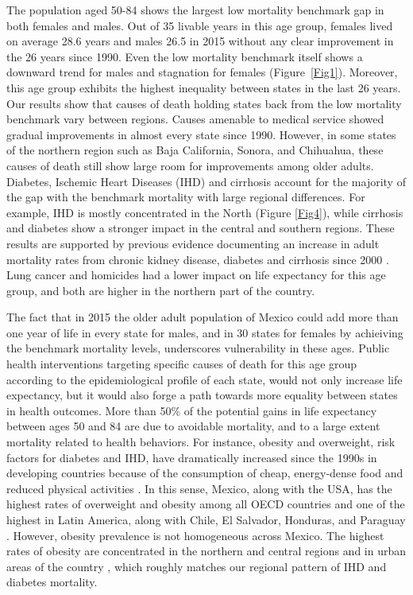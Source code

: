 \documentclass{bmcart}
\begin{document}
The population aged 50-84 shows the largest low mortality benchmark gap in both females and males. Out of 35 livable years in this age group, females lived on average 28.6 years and males 26.5 in 2015 without any clear improvement in the 26 years since 1990. Even the low mortality benchmark itself shows a downward trend for males and stagnation for females (Figure~\ref{Fig1}). Moreover, this age group exhibits the highest inequality between states in the last 26 years. Our results show that causes of death holding states back from the low mortality benchmark vary between regions. Causes amenable to medical service showed gradual improvements in almost every state since 1990. However, in some states of the northern region such as Baja California, Sonora, and Chihuahua, these causes of death still show large room for improvements among older adults. Diabetes, Ischemic Heart Diseases (IHD) and cirrhosis account for the majority of the gap with the benchmark mortality with large regional differences. For example, IHD is mostly concentrated in the North (Figure \ref{Fig4}), while cirrhosis and diabetes show a stronger impact in the central and southern regions. These results are supported by previous evidence documenting an increase in adult mortality rates from chronic kidney disease, diabetes and cirrhosis since 2000 \cite{gomez2016dissonant}. Lung cancer and homicides had a lower impact on life expectancy for this age group, and both are higher in the northern part of the country. 

The fact that in 2015 the older adult population of Mexico could add more than one year of life in every state for males, and in 30 states for females by achieiving the benchmark mortality levels, underscores vulnerability in these ages. Public health interventions targeting specific causes of death for this age group according to the epidemiological profile of each state, would not only increase life expectancy, but it would also forge a path towards more equality between states in health outcomes. More than 50\% of the potential gains in life expectancy between ages 50 and 84 are due to avoidable mortality, and to a large extent mortality related to health behaviors. For instance, obesity and overweight, risk factors for diabetes and IHD, have dramatically increased since the 1990s in developing countries because of the consumption of cheap, energy-dense food and reduced physical activities \cite{hossain2007obesity}. In this sense, Mexico, along with the USA, has the highest rates of overweight and obesity among all OECD countries  \cite{gonzalez2016mexico} and one of the highest in Latin America, along with Chile, El Salvador, Honduras, and Paraguay \cite{aschner2016obesity}. However, obesity prevalence is not homogeneous across Mexico. The highest rates of obesity are concentrated in the northern and central regions \cite{gonzalez2016mexico} and in urban areas of the country \cite{kuri2009prevalence}, which roughly matches our regional pattern of IHD and diabetes mortality.
\end{document}
